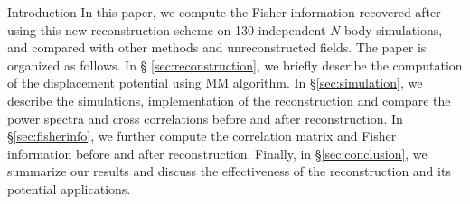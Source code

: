 \begin{section}{Introduction}
  In this paper, we compute the Fisher information recovered after
  using this new reconstruction scheme on 130 independent $N$-body
  simulations, and compared with other methods and unreconstructed
  fields.  The paper is organized as follows.  In \S
  \ref{sec:reconstruction}, we briefly
  describe the computation of the displacement potential using MM
  algorithm. In \S \ref{sec:simulation}, we describe  
  the simulations, implementation of the reconstruction and compare 
  the power spectra and cross correlations before and after reconstruction.  
  In \S \ref{sec:fisherinfo}, we further compute the correlation matrix 
  and Fisher information before and
  after reconstruction.  Finally, in \S \ref{sec:conclusion}, we summarize 
  our results and 
  discuss the effectiveness of the reconstruction and its potential
  applications.


\end{section}

